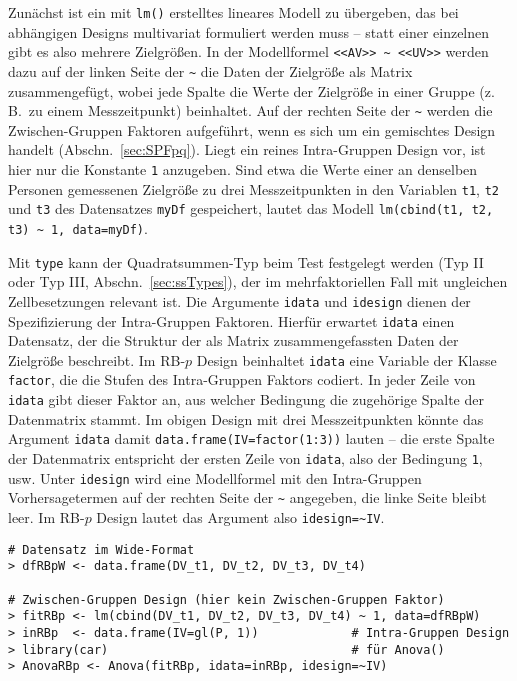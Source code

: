 Zunächst ist ein mit \lstinline!lm()! erstelltes lineares Modell zu übergeben, das bei abhängigen Designs multivariat formuliert werden muss -- statt einer einzelnen gibt es also mehrere Zielgrößen. In der Modellformel \lstinline!<<AV>> ~ <<UV>>! werden dazu auf der linken Seite der \lstinline!~! die Daten der Zielgröße als Matrix zusammengefügt, wobei jede Spalte die Werte der Zielgröße in einer Gruppe (z.\,B.\ zu einem Messzeitpunkt) beinhaltet. Auf der rechten Seite der \lstinline!~! werden die Zwischen-Gruppen Faktoren aufgeführt, wenn es sich um ein gemischtes Design handelt (Abschn.\ \ref{sec:SPFpq}). Liegt ein reines Intra-Gruppen Design vor, ist hier nur die Konstante \lstinline!1! anzugeben. Sind etwa die Werte einer an denselben Personen gemessenen Zielgröße zu drei Messzeitpunkten in den Variablen \lstinline!t1!, \lstinline!t2! und \lstinline!t3! des Datensatzes \lstinline!myDf! gespeichert, lautet das Modell \lstinline!lm(cbind(t1, t2, t3) ~ 1, data=myDf)!.

Mit \lstinline!type! kann der Quadratsummen-Typ beim Test festgelegt werden (Typ II oder Typ III, Abschn.\ \ref{sec:ssTypes}), der im mehrfaktoriellen Fall mit ungleichen Zellbesetzungen relevant ist. Die Argumente \lstinline!idata! und \lstinline!idesign! dienen der Spezifizierung der Intra-Gruppen Faktoren. Hierfür erwartet \lstinline!idata! einen Datensatz, der die Struktur der als Matrix zusammengefassten Daten der Zielgröße beschreibt. Im RB-$p$ Design beinhaltet \lstinline!idata! eine Variable der Klasse \lstinline!factor!, die die Stufen des Intra-Gruppen Faktors codiert. In jeder Zeile von \lstinline!idata! gibt dieser Faktor an, aus welcher Bedingung die zugehörige Spalte der Datenmatrix stammt. Im obigen Design mit drei Messzeitpunkten könnte das Argument \lstinline!idata! damit \lstinline!data.frame(IV=factor(1:3))! lauten -- die erste Spalte der Datenmatrix entspricht der ersten Zeile von \lstinline!idata!, also der Bedingung \lstinline!1!, usw. Unter \lstinline!idesign! wird eine Modellformel mit den Intra-Gruppen Vorhersagetermen auf der rechten Seite der \lstinline!~! angegeben, die linke Seite bleibt leer. Im RB-$p$ Design lautet das Argument also \lstinline!idesign=~IV!.
\begin{lstlisting}
# Datensatz im Wide-Format
> dfRBpW <- data.frame(DV_t1, DV_t2, DV_t3, DV_t4)

# Zwischen-Gruppen Design (hier kein Zwischen-Gruppen Faktor)
> fitRBp <- lm(cbind(DV_t1, DV_t2, DV_t3, DV_t4) ~ 1, data=dfRBpW)
> inRBp  <- data.frame(IV=gl(P, 1))             # Intra-Gruppen Design
> library(car)                                  # für Anova()
> AnovaRBp <- Anova(fitRBp, idata=inRBp, idesign=~IV)
\end{lstlisting}

